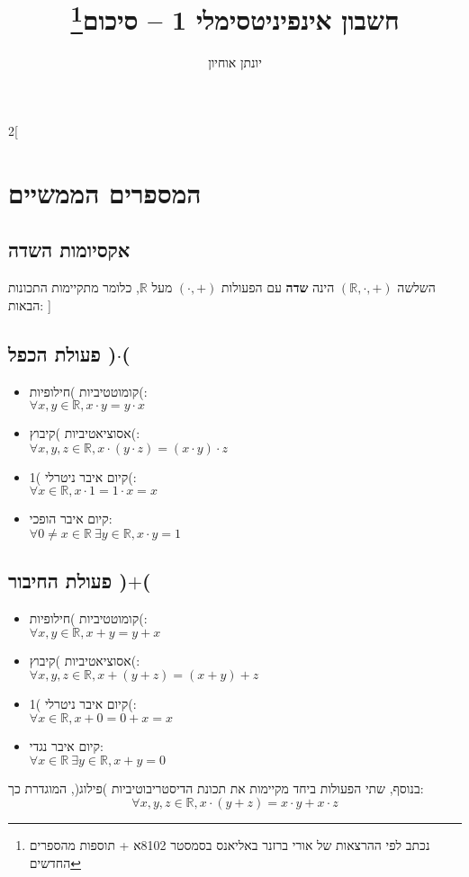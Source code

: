 \documentclass[11pt, oneside]{article}
\title{חשבון אינפיניטסימלי 1 -- סיכום\thanks{נכתב לפי ההרצאות של אורי ברזנר באליאנס בסמסטר 8102א + תוספות מהספרים החדשים}}
\author{יונתן אוחיון}
\newcommand{\mR}{\mathbb{R}}
\renewcommand{\b}[1]{\textbf{#1}}
\begin{document}
\maketitle

\begin{multicols}{2}[
\section*{המספרים הממשיים}
\subsection*{אקסיומות השדה}
השלשה $(\mR, \cdot, +)$ הינה \b{שדה} עם הפעולות $(\cdot, +)$ מעל $\mR$, כלומר מתקיימות התכונות הבאות:
]
\subsection*{פעולת הכפל )$\cdot$(}
\begin{itemize}[leftmargin=*]
\item קומוטטיביות )חילופיות(:\\
$\forall x, y \in \mR, x \cdot y = y \cdot x$

\item אסוציאטיביות )קיבוץ(:\\
$\forall x, y, z \in \mR, x \cdot (y \cdot z) = (x \cdot y) \cdot z$

\item קיום איבר ניטרלי )1(:\\
$\forall x \in \mR, x \cdot 1 = 1 \cdot x = x$

\item קיום איבר הופכי:\\
$\forall 0 \neq x \in \mR\ \exists y \in \mR, x \cdot y = 1$
\end{itemize}

\columnbreak

\subsection*{פעולת החיבור )$+$(}
\begin{itemize}[leftmargin=*]
\item קומוטטיביות )חילופיות(:\\
$\forall x, y \in \mR, x + y = y + x$

\item אסוציאטיביות )קיבוץ(:\\
$\forall x, y, z \in \mR, x + (y + z) = (x + y) + z$

\item קיום איבר ניטרלי )1(:\\
$\forall x \in \mR, x + 0 = 0 + x = x$

\item קיום איבר נגדי:\\
$\forall x \in \mR\ \exists y \in \mR, x + y = 0$
\end{itemize}
\end{multicols}
בנוסף, שתי הפעולות ביחד מקיימות את תכונת הדיסטריבוטיביות )פילוג(, המוגדרת כך:
\[
\forall x, y, z \in \mR, x \cdot (y + z) = x \cdot y + x \cdot z
\]
\clearpage
\end{document}

